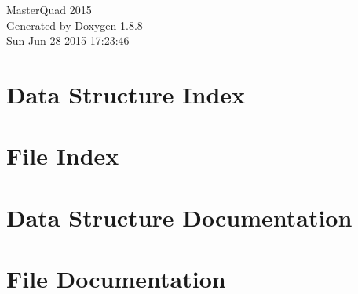 \documentclass[twoside]{book}
\newcommand{\+}{\discretionary{\mbox{\scriptsize$\hookleftarrow$}}{}{}}
\newcommand{\clearemptydoublepage}{%
  \newpage{\pagestyle{empty}\cleardoublepage}%
}
\begin{document}
\hypersetup{pageanchor=false,
             bookmarks=true,
             bookmarksnumbered=true,
             pdfencoding=unicode
            }
\begin{titlepage}
\vspace*{7cm}
\begin{center}%
{\Large Master\+Quad 2015 }\\
\vspace*{1cm}
{\large Generated by Doxygen 1.8.8}\\
\vspace*{0.5cm}
{\small Sun Jun 28 2015 17:23:46}\\
\end{center}
\end{titlepage}
\clearemptydoublepage
\tableofcontents
\clearemptydoublepage
{}
\hypersetup{pageanchor=true}

\chapter{Data Structure Index}

\chapter{File Index}

\chapter{Data Structure Documentation}











\chapter{File Documentation}












































\newpage
{}
{}
\printindex
\end{document}
